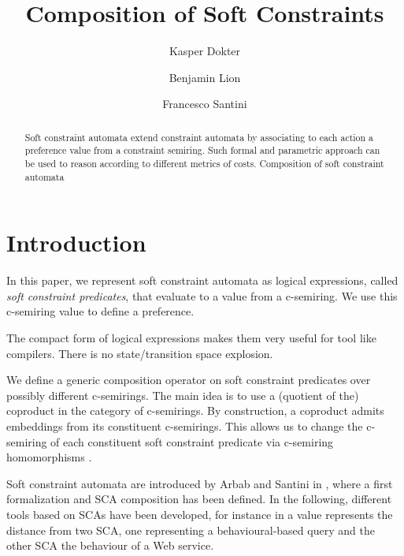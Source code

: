 \documentclass[runningheads]{llncs}
\title{Composition of Soft Constraints}
\author{Kasper Dokter\inst{1} \and Benjamin Lion\inst{1} \and Francesco Santini\inst{2}
\institute{Centrum Wiskunde \& Informatica, Amsterdam, Netherlands 
\and Dipartimento di Matematica e Informatica, University of Perugia, Italy}
}
\begin{document}
\maketitle

\pagestyle{headings} 

\begin{abstract}
Soft constraint automata extend constraint automata by associating to each action a preference value from a constraint semiring. Such formal and parametric approach can be used to reason according to different metrics of costs.
Composition of soft constraint automata
\end{abstract}

\section{Introduction}
\label{sec:intro}



In this paper, we represent soft constraint automata as logical expressions, called {\em soft constraint predicates}, that evaluate to a value from a c-semiring.
We use this c-semiring value to define a preference.


The compact form of logical expressions makes them very useful for tool like compilers.
There is no state/transition space explosion. 

We define a generic composition operator on soft constraint predicates over possibly different c-semirings.
The main idea is to use a (quotient of the) coproduct in the category of c-semirings.
By construction, a coproduct admits embeddings from its constituent c-semirings.
This allows us to change the c-semiring of each constituent soft constraint predicate via c-semiring homomorphisms \cite{LY08}.



Soft constraint automata are introduced by Arbab and Santini in \cite{AS12}, where a first formalization and SCA composition has been defined.
In the following, different tools based on SCAs have been developed, for instance in \cite{SSAA13} a value represents the distance from two SCA, one representing a behavioural-based query and the other SCA the behaviour of a Web service.
\end{document}
